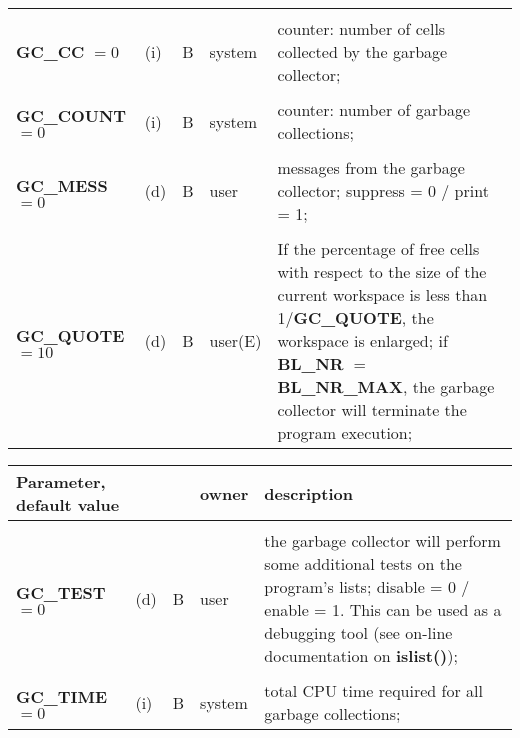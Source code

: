 {{\begin{tabular}{p{1.65in}p{0.2in}|p{0.15in}|p{0.54in}|p{2.60in}}
                           &     &      &               & \\
{\bf GC\_CC} $=0$          & (i) & B    & system        & counter: number of cells collected by the \newline
                                                          garbage collector;\\
                           &     &      &               & \\ 
{\bf GC\_COUNT} $=0$       & (i) & B    & system        & counter: number of garbage collections;\\
                           &     &      &               & \\
{\bf GC\_MESS} $=0$        & (d) & B    & user          & messages from the garbage collector; \newline suppress = 0 / print = 1;\\
                           &     &      &               & \\
{\bf GC\_QUOTE} $=10$      & (d) & B    & user(E)       & If the percentage of 
                free cells with respect to the size of the current workspace is 
                less than 1/{\bf GC\_QUOTE}, the workspace is enlarged; 
                if {\bf BL\_NR} $=$ {\bf BL\_NR\_MAX}, the garbage collector 
                will terminate the program ex\-ecu\-tion; 
\end{tabular}
\newpage
\begin{tabular}{p{1.65in}p{0.2in}|p{0.15in}|p{0.54in}|p{2.60in}} 
{Parameter, default value} &     &      & owner         & description \\ \hline  
                           &     &      &               & \\
{\bf GC\_TEST} $=0$        & (d) & B    & user          & the garbage collector will perform some additional tests on the program's
                                                          lists; \newline disable = 0 / enable = 1. This can be used as a debugging tool
                                                          (see on-line documentation on {\bf islist()});\\
                           &     &      &               & \\
{\bf GC\_TIME} $=0$        & (i) & B    & system        & total CPU time required for all garbage \newline
                                                          collections;\\

\end{tabular}}}
